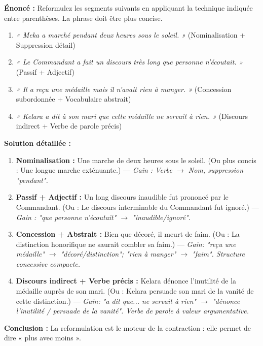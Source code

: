 \documentclass[11pt]{article}
\newcommand{\cle}[1]{{\popxbold\color{popdark}#1}}
\begin{document}
\begin{exoresolu}
    \textbf{Énoncé :} Reformulez les segments suivants en appliquant la technique indiquée entre parenthèses. La phrase doit être plus concise.
    \begin{enumerate}
        \item \textit{« Meka a marché pendant deux heures sous le soleil. »} (Nominalisation + Suppression détail)
        \item \textit{« Le Commandant a fait un discours très long que personne n'écoutait. »} (Passif + Adjectif)
        \item \textit{« Il a reçu une médaille mais il n'avait rien à manger. »} (Concession subordonnée + Vocabulaire abstrait)
        \item \textit{« Kelara a dit à son mari que cette médaille ne servait à rien. »} (Discours indirect + Verbe de parole précis)
    \end{enumerate}
    \tcblower
    \textbf{Solution détaillée :}
    \begin{enumerate}
        \item \textbf{Nominalisation :} \cle{Une marche de deux heures sous le soleil.} (Ou plus concis : \cle{Une longue marche exténuante.}) — \textit{Gain : Verbe $\rightarrow$ Nom, suppression "pendant".}
        \item \textbf{Passif + Adjectif :} \cle{Un long discours inaudible fut prononcé par le Commandant.} (Ou : \cle{Le discours interminable du Commandant fut ignoré.}) — \textit{Gain : "que personne n'écoutait" $\rightarrow$ "inaudible/ignoré".}
        \item \textbf{Concession + Abstrait :} \cle{Bien que décoré, il meurt de faim.} (Ou : \cle{La distinction honorifique ne saurait combler sa faim.}) — \textit{Gain: "reçu une médaille" $\rightarrow$ "décoré/distinction"; "rien à manger" $\rightarrow$ "faim". Structure concessive compacte.}
        \item \textbf{Discours indirect + Verbe précis :} \cle{Kelara dénonce l'inutilité de la médaille auprès de son mari.} (Ou : \cle{Kelara persuade son mari de la vanité de cette distinction.}) — \textit{Gain: "a dit que... ne servait à rien" $\rightarrow$ "dénonce l'inutilité / persuade de la vanité". Verbe de parole à valeur argumentative.}
    \end{enumerate}
    \textbf{Conclusion :} La reformulation est le moteur de la contraction : elle permet de dire « plus avec moins ».
\end{exoresolu}
\end{document}
